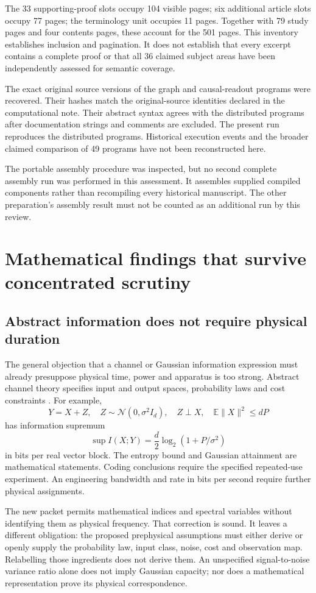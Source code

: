 \documentclass[11pt,a4paper]{article}
\begin{document}
The 33 supporting-proof slots occupy 104 visible pages; six additional article slots occupy 77 pages; the terminology unit occupies 11 pages. Together with 79 study pages and four contents pages, these account for the 501 pages. This inventory establishes inclusion and pagination. It does not establish that every excerpt contains a complete proof or that all 36 claimed subject areas have been independently assessed for semantic coverage.

The exact original source versions of the graph and causal-readout programs were recovered. Their hashes match the original-source identities declared in the computational note. Their abstract syntax agrees with the distributed programs after documentation strings and comments are excluded. The present run reproduces the distributed programs. Historical execution events and the broader claimed comparison of 49 programs have not been reconstructed here.

The portable assembly procedure was inspected, but no second complete assembly run was performed in this assessment. It assembles supplied compiled components rather than recompiling every historical manuscript. The other preparation's assembly result must not be counted as an additional run by this review.

\section{Mathematical findings that survive concentrated scrutiny}

\subsection{Abstract information does not require physical duration}
The general objection that a channel or Gaussian information expression must already presuppose physical time, power and apparatus is too strong. Abstract channel theory specifies input and output spaces, probability laws and cost constraints \cite{polyanskiy}. For example,
\[
Y=X+Z,\quad Z\sim\mathcal N(0,\sigma^2I_d),\quad Z\perp X,\quad
\mathbb E\|X\|^2\le dP
\]
has information supremum
\[
\sup I(X;Y)=\frac d2\log_2(1+P/\sigma^2)
\]
in bits per real vector block. The entropy bound and Gaussian attainment are mathematical statements. Coding conclusions require the specified repeated-use experiment. An engineering bandwidth and rate in bits per second require further physical assignments.

The new packet permits mathematical indices and spectral variables without identifying them as physical frequency. That correction is sound. It leaves a different obligation: the proposed prephysical assumptions must either derive or openly supply the probability law, input class, noise, cost and observation map. Relabelling those ingredients does not derive them. An unspecified signal-to-noise variance ratio alone does not imply Gaussian capacity; nor does a mathematical representation prove its physical correspondence.
\end{document}
